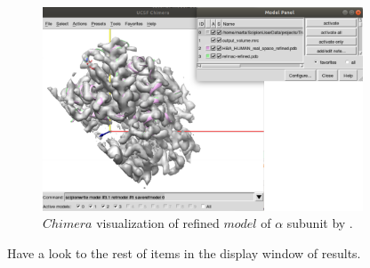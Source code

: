   \begin{figure}[H]
  \centering 
  \captionsetup{width=.7\linewidth} 
  \includegraphics[width=0.85\textwidth]{Images/Fig33}
  \caption{$Chimera$ visualization of refined $model$ of  $\alpha$ subunit by .}
  \label{fig:refmac_chimera}
  \end{figure}
  
  Have a look to the rest of items in the display window of results. 
  
